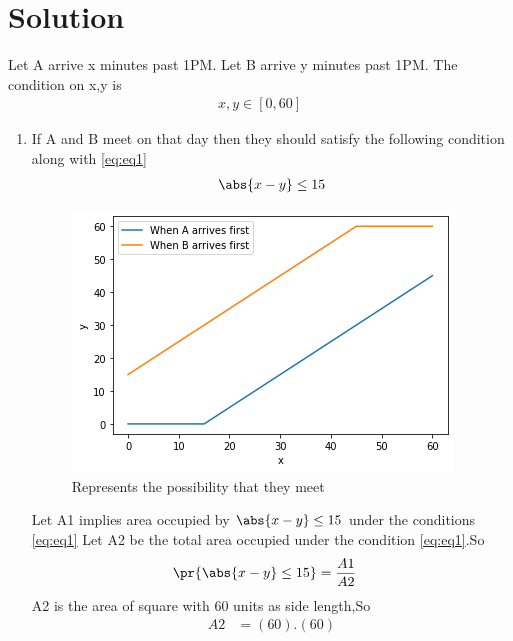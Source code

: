 \documentclass[journal,12pt,twocolumn]{IEEEtran}
\begin{document}
\section{Solution}
Let A arrive x minutes past 1PM.
\newline
Let B arrive y minutes past 1PM.
\newline \newline
The condition on x,y is
\begin{align}
    x,y \in [0,60]
    \label{eq:eq1}
\end{align}
\begin{enumerate}
    \item 
If A and B meet on that day then they should satisfy the following condition along with \eqref{eq:eq1}
\begin{align}
    \abs{x - y}\leq15
    \label{eq:eq2}
\end{align}
\newline
\begin{figure}[ht]
    \centering
    \includegraphics[width=\columnwidth]{Assignment3.png}
    \caption{Represents the possibility that  they meet }
    \label{fig:graph1}
\end{figure}
Let A1 implies area occupied by $\abs{x-y}\leq 15 $ under the conditions \eqref{eq:eq1}
\newline
Let A2 be the total area occupied under the condition \eqref{eq:eq1}.So
\begin{align}
    \pr{\abs{x - y}\leq15}&=\frac{A1}{A2}
    \label{eq:eq3}
\end{align}
A2 is the area of square with 60 units as side length,So
\begin{align}
    A2&=(60).(60)
    \\

\end{align}
\end{enumerate}
\end{document}
